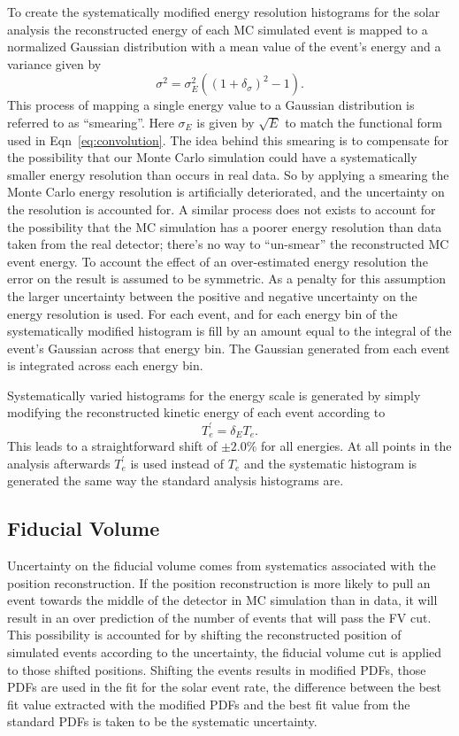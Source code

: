 To create the systematically modified energy resolution histograms for the
solar analysis the reconstructed
energy of each MC simulated event is mapped to a normalized Gaussian distribution with a
mean value of the event's energy and a
variance given by
\begin{equation}
  \sigma^{2} = \sigma_{E}^{2}\left(\left(1 + \delta_{\sigma}\right)^2 - 1\right)\text{.}
  \label{eqn:systmatic_esmear}
\end{equation}
This process of mapping a single energy value to a Gaussian distribution is
referred to as ``smearing''.
Here $\sigma_{E}$ is given by $\sqrt{E}$ to match the functional form used in
Eqn~\ref{eq:convolution}.
The idea behind this smearing is to compensate for the possibility that our
Monte Carlo simulation could have a systematically smaller energy resolution
than occurs in real data.
So by applying a smearing the Monte Carlo energy resolution is artificially
deteriorated, and the uncertainty on the resolution is accounted for.
A similar process does not exists to account for the possibility that the
MC simulation has a poorer energy resolution than data taken from the
real detector; there's no way to ``un-smear'' the reconstructed MC event
energy.
To account the effect of an over-estimated energy resolution the error on
the result is assumed to be symmetric.
As a penalty for this assumption the larger uncertainty between the positive
and negative uncertainty on the energy resolution is used.
For each event, and for each energy bin of the systematically modified histogram
is fill by an amount equal to the integral of the event's Gaussian across that
energy bin.
The Gaussian generated from each event is integrated across each energy bin.

Systematically varied histograms for the energy scale is generated by simply
modifying the reconstructed kinetic energy of each event according to
\begin{equation}
  T^{\prime}_{e} = \delta_{E}T_{e}\text{.}
\end{equation}
This leads to a straightforward shift of $\pm 2.0\%$ for all energies.
At all points in the analysis afterwards $T^{\prime}_{e}$ is used instead of $T_{e}$
and the systematic histogram is generated the same way the standard analysis histograms
are.

\subsection{Fiducial Volume}
Uncertainty on the fiducial volume comes from systematics associated
with the position reconstruction.
If the position reconstruction is more likely to pull an event towards the
middle of the detector in MC simulation than in data, it will result in an over
prediction of the number of events that will pass the FV cut.
This possibility is accounted for by shifting the reconstructed position of
simulated events according to the uncertainty, the fiducial volume cut is
applied to those shifted positions.
Shifting the events results in modified PDFs, those PDFs are used in the fit
for the solar event rate, the difference between the best fit value extracted
with the modified PDFs and the best fit value from the standard PDFs is taken
to be the systematic uncertainty.

